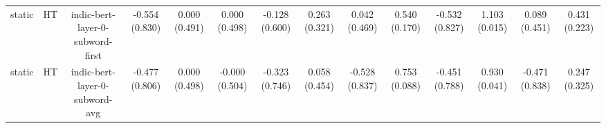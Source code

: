 \begin{sidewaystable}[htb]
\begin{tabular}{@{}cccccccccccccc@{}}
        static & HT & indic-bert-layer-0-subword-first & -0.554 (0.830) & 0.000 (0.491) & 0.000 (0.498) & -0.128 (0.600) & 0.263 (0.321) & 0.042 (0.469) & 0.540 (0.170) & -0.532 (0.827) & 1.103 (0.015) & 0.089 (0.451) & 0.431 (0.223) \\
        static & HT & indic-bert-layer-0-subword-avg & -0.477 (0.806) & 0.000 (0.498) & -0.000 (0.504) & -0.323 (0.746) & 0.058 (0.454) & -0.528 (0.837) & 0.753 (0.088) & -0.451 (0.788) & 0.930 (0.041) & -0.471 (0.838) & 0.247 (0.325) \\
        \bottomrule
    \end{tabular}
\end{sidewaystable}